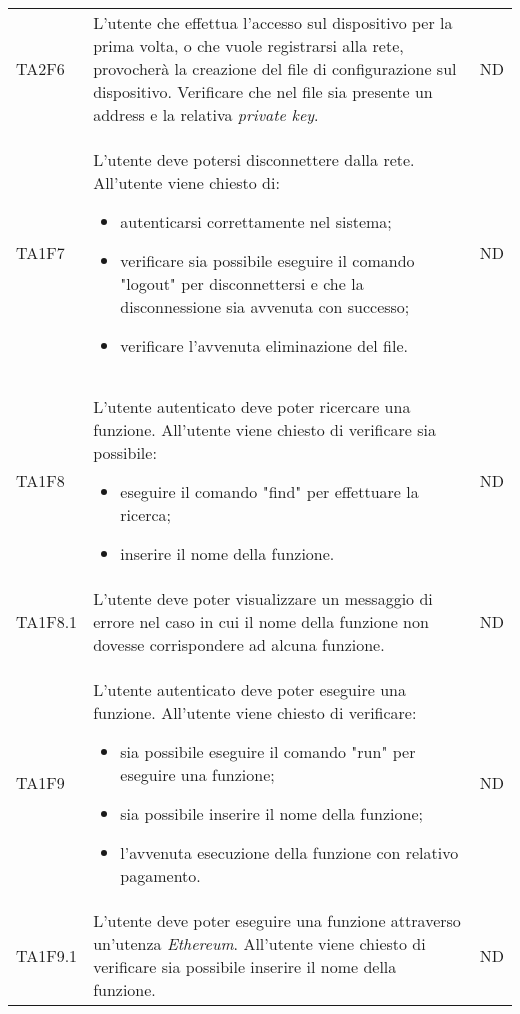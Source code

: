 \begin{longtable}{|C{1.5cm}|C{9cm}|C{3cm}|}
	TA2F6 &
	L'utente che effettua l'accesso sul dispositivo per la prima volta, o che vuole registrarsi alla rete, provocherà la creazione del file di configurazione sul dispositivo. Verificare che nel file sia presente un address e la relativa \textit{private key\glo}. &
	ND \\

	TA1F7  &
	L’utente deve potersi disconnettere dalla rete. All’utente viene chiesto di:
	\begin{itemize}
		\item autenticarsi correttamente nel sistema;
		\item verificare sia possibile eseguire il comando "logout" per disconnettersi e che la disconnessione sia avvenuta con successo;
		\item verificare l'avvenuta eliminazione del file.
	\end{itemize} &
	ND \\[-5ex]

	TA1F8  &
	L’utente autenticato deve poter ricercare una funzione. All’utente viene chiesto di verificare sia possibile:
	\begin{itemize}
		\item eseguire il comando "find" per effettuare la ricerca;
		\item inserire il nome della funzione.
	\end{itemize} &
	ND \\[-5ex]

	TA1F8.1  &
	L’utente deve poter visualizzare un messaggio di errore nel caso in cui il nome della funzione non dovesse corrispondere ad alcuna funzione. &
	ND \\

	TA1F9  &
	L’utente autenticato deve poter eseguire una funzione. All’utente viene chiesto di verificare:
	\begin{itemize}
		\item sia possibile eseguire il comando "run" per eseguire una funzione;
		\item sia possibile inserire il nome della funzione;
		\item l'avvenuta esecuzione della funzione con relativo pagamento.
	\end{itemize} &
	ND \\[-5ex]

	TA1F9.1  &
	L’utente deve poter eseguire una funzione attraverso un'utenza \textit{Ethereum\glos}. All’utente viene chiesto di verificare sia possibile inserire il nome della funzione. &
	ND \\


\end{longtable}
